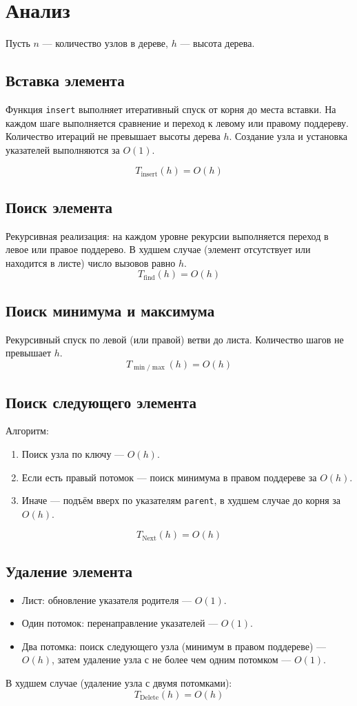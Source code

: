 \documentclass[otchet]{SCWorks}
\begin{document}
\newpage

\section{Анализ}

Пусть \(n\) — количество узлов в дереве, \(h\) — высота дерева.

\subsection{Вставка элемента}

Функция \texttt{insert} выполняет итеративный спуск от корня до места вставки. На каждом шаге выполняется сравнение и переход к левому или правому поддереву. Количество итераций не превышает высоты дерева \(h\). Создание узла и установка указателей выполняются за \(O(1)\).

\[
T_{\text{insert}}(h) = O(h)
\]

\subsection*{Поиск элемента}
Рекурсивная реализация: на каждом уровне рекурсии выполняется переход в левое или правое поддерево. В худшем случае (элемент отсутствует или находится в листе) число вызовов равно \(h\).
\[
T_{\text{find}}(h) = O(h)
\]

\subsection{Поиск минимума и максимума}
Рекурсивный спуск по левой (или правой) ветви до листа. Количество шагов не превышает \(h\).
\[
T_{\min/\max}(h) = O(h)
\]

\subsection{Поиск следующего элемента}
Алгоритм:
\begin{enumerate}
    \item Поиск узла по ключу — \(O(h)\).
    \item Если есть правый потомок — поиск минимума в правом поддереве за \(O(h)\).
    \item Иначе — подъём вверх по указателям \texttt{parent}, в худшем случае до корня за \(O(h)\).
\end{enumerate}
\[
T_{\text{Next}}(h) = O(h)
\]

\subsection{Удаление элемента}
\begin{itemize}
    \item Лист: обновление указателя родителя — \(O(1)\).
    \item Один потомок: перенаправление указателей — \(O(1)\).
    \item Два потомка: поиск следующего узла (минимум в правом поддереве) — \(O(h)\), затем удаление узла с не более чем одним потомком — \(O(1)\).
\end{itemize}
В худшем случае (удаление узла с двумя потомками):
\[
T_{\text{Delete}}(h) = O(h)
\]
\end{document}
